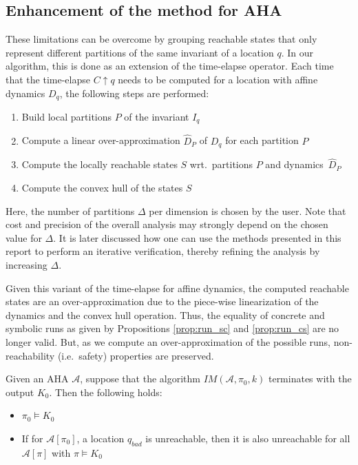 \documentclass{llncs}
\newcommand{\IM}{\ensuremath{\mathit{IM}}}
\newcommand{\A}{\ensuremath{\mathcal{A}}}
\newcommand{\telapse}{\ensuremath{\uparrow}}
\begin{document}
\subsection{Enhancement of the method for AHA}\label{sec:laha}

These limitations can be overcome by grouping reachable states that only
represent different partitions of the same invariant of a location
$q$. In our algorithm, this is done as an extension of the time-elapse
operator. Each time that the time-elapse $C \telapse{q}$ needs to be
computed for a location with affine dynamics $D_q$, the
following steps are performed:
\begin{enumerate}
\item Build local partitions $P$ of the invariant $I_q$
\item Compute a linear over-approximation $\hat{D}_P$ of $D_q$ for
  each partition $P$
\item Compute the locally reachable states $S$ wrt.~partitions
  $P$ and dynamics~$\hat{D}_P$
\item Compute the convex hull of the states $S$
\end{enumerate}

Here, the number of partitions $\Delta$ per dimension is chosen by the
user. Note that cost and precision of the overall analysis may
strongly depend on the chosen value for $\Delta$. It is later
discussed how one can use the methods presented in this report to
perform an iterative verification, thereby refining the analysis by
increasing $\Delta$.

Given this variant of the time-elapse for affine dynamics, the
computed reachable states are an over-approximation due to the
piece-wise linearization of the dynamics and the convex hull
operation. Thus, the equality of concrete and symbolic runs as given
by Propositions \ref{prop:run_sc} and \ref{prop:run_cs} are no longer
valid. But, as we compute an over-approximation of the possible runs,
non-reachability (i.e.~safety) properties are preserved. 
\begin{proposition}
  Given an AHA $\A$, suppose that the algorithm $\IM(\A, \pi_0, k)$
  terminates with the output $K_0$. Then the following holds:
  \begin{itemize}
  \item $\pi_0 \models K_0$
  \item If for $\A[\pi_0]$, a location $q_{bad}$ is unreachable, then
    it is also unreachable for all $\A[\pi]$ with $\pi \models K_0$
  \end{itemize}
\end{proposition}
\end{document}
